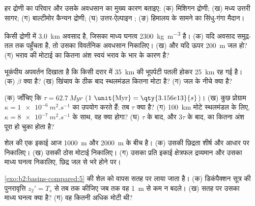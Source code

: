 \begin{exercise}[$\star$]\label{exo:b2:basins-compared:1}
हर द्रोणी का परिवार और उसके अवधसान का मुख्य कारण बताइए: (क) मिशिगन द्रोणी;
(ख) मध्य उत्तरी सागर; (ग) बाल्टीमोर कैन्यन द्रोणी; (घ) उत्तर-ऐल्पाइन ;
(ङ) हिमालय के सामने का सिंधु-गंगा मैदान।
\end{exercise}

\begin{exercise}[$\star$]\label{exo:b2:basins-compared:2}
किसी द्रोणी में \qty{3.0}{km} अवसाद है, जिसका माध्य घनत्व \qty{2300}{kg.m^{-3}} है। (क) यदि अवसाद समुद्र-तल तक पहुँचता है, तो
उसका विवर्तनिक अवधसान निकालिए। (ख) और यदि ऊपर \qty{200}{m} जल
हो? (ग) भराव की मोटाई का कितना अंश स्वयं भराव के भार के कारण है?
\end{exercise}

\begin{exercise}[$\star$]\label{exo:b2:basins-compared:3}
भूकंपीय अपवर्तन दिखाता है कि किसी दरार में \qty{35}{km} की भूपर्पटी पतली होकर \qty{25}{km} रह गई है।
(क) $\beta$ क्या है? (ख) खिंचाव के ठीक बाद स्थलमंडल कितना मोटा है? (ग) जल के नीचे
 क्या है?
\end{exercise}

\begin{exercise}[$\star$]\label{exo:b2:basins-compared:4}
(क) जाँचिए कि $\tau = \qty{62.7}{Myr}$ ($1~\text{\unit{Myr}} = \qty{3.156e13}{s}$)। (ख) कुछ प्रोग्राम
$\kappa = \qty{1e-6}{m^2.s^{-1}}$ का उपयोग करते हैं: तब $\tau$ क्या है? (ग) \qty{100}{km} मोटे
स्थलमंडल के लिए, $\kappa = \qty{8e-7}{m^2.s^{-1}}$ के साथ, वह क्या होगा? (घ) $\tau$ के बाद, और $3\tau$ के बाद,
 का कितना अंश पूरा हो चुका होता है?
\end{exercise}

\begin{exercise}[$\star\star$]\label{exo:b2:basins-compared:5}
शेल की एक इकाई आज \qty{1000}{m} और \qty{2000}{m} के बीच है। (क) उसकी छिद्रता शीर्ष
और आधार पर निकालिए। (ख) उसकी ठोस मोटाई निकालिए। (ग) उसका प्रति इकाई क्षेत्रफल द्रव्यमान और उसका माध्य
घनत्व निकालिए, छिद्र जल से भरे होने पर।
\end{exercise}

\begin{exercise}[$\star\star$]\label{exo:b2:basins-compared:6}
\cref{exo:b2:basins-compared:5} की शेल को वापस सतह पर लाया जाता है। (क) डिकंपैक्शन सूत्र की
पुनरावृत्ति $z_2' = T_s$ से तब तक कीजिए जब तक वह \qty{1}{m} से कम न बदले। (ख) सतह पर
उसका माध्य घनत्व क्या है? (ग) वह कितनी अधिक मोटी थी?
\end{exercise}

